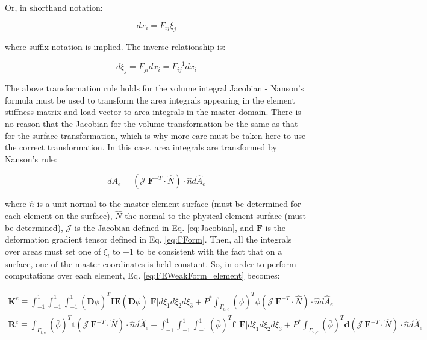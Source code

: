 \documentclass[10pt]{article}
\begin{document}
Or, in shorthand notation:

\begin{equation}
dx_i=F_{ij}\xi_j
\end{equation}

where suffix notation is implied. The inverse relationship is:

\begin{equation}
d\xi_j=F_{ji}dx_i=F_{ij}^{-1}dx_i
\end{equation}

The above transformation rule holds for the volume integral Jacobian - Nanson's formula must be used to transform the area integrals appearing in the element stiffness matrix and load vector to area integrals in the master domain. There is no reason that the Jacobian for the volume transformation be the same as that for the surface transformation, which is why more care must be taken here to use the correct transformation. In this case, area integrals are transformed by Nanson's rule:

\begin{equation}
\label{eq:Nanson}
dA_e=(\mathscr{J}\ \textbf{F}^{-T}\cdot\hat{N})\cdot\hat{n}d\hat{A}_e
\end{equation}

where \(\hat{n}\) is a unit normal to the master element surface (must be determined for each element on the surface), \(\hat{N}\) the normal to the physical element surface (must be determined), \(\mathscr{J}\) is the Jacobian defined in Eq. \eqref{eq:Jacobian}, and \(\textbf{F}\) is the deformation gradient tensor defined in Eq. \eqref{eq:FForm}. Then, all the integrals over areas must set one of \(\xi_i\) to \(\pm1\) to be consistent with the fact that on a surface, one of the master coordinates is held constant. So, in order to perform computations over each element, Eq. \eqref{eq:FEWeakForm_element} becomes:

\begin{equation}
\label{eq:FEWeakForm_element}
\begin{aligned}
\textbf{K}^e\equiv\int_{-1}^{1}\int_{-1}^{1}\int_{-1}^{1}(\textbf{D}\bar{\bar{\phi}})^T\textbf{IE}(\textbf{D}\bar{\bar{\phi}})|\textbf{F}|d\xi_1d\xi_2d\xi_3 +P^{*}\int_{\Gamma_{u,e}}(\bar{\bar{\phi}})^T\bar{\bar{\phi}}(\mathscr{J}\ \textbf{F}^{-T}\cdot\hat{N})\cdot\hat{n}d\hat{A}_e\\
\textbf{R}^e\equiv\int_{\Gamma_{t,e}}(\bar{\bar{\phi}})^T\textbf{t}(\mathscr{J}\ \textbf{F}^{-T}\cdot\hat{N})\cdot\hat{n}d\hat{A}_e+\int_{-1}^{1}\int_{-1}^{1}\int_{-1}^{1}(\bar{\bar{\phi}})^T\textbf{f}\ |\textbf{F}|d\xi_1d\xi_2d\xi_3+P^{*}\int_{\Gamma_{u,e}}(\bar{\bar{\phi}})^T\textbf{d}(\mathscr{J}\ \textbf{F}^{-T}\cdot\hat{N})\cdot\hat{n}d\hat{A}_e\\
\end{aligned}
\end{equation}
\end{document}
